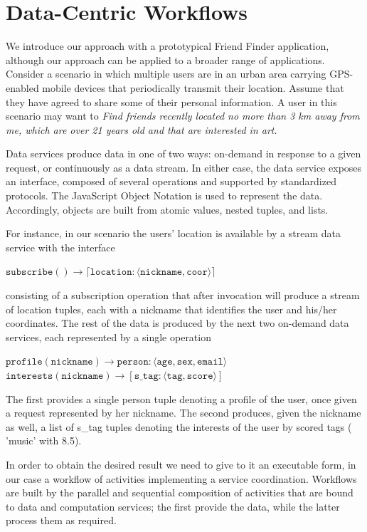 
\section{Data-Centric Workflows}\label{sec:dataCentricWorkflows}

We introduce our approach with a prototypical Friend Finder application, although our approach can be applied to a broader range of applications. Consider a scenario in which multiple users are in an urban area carrying GPS-enabled mobile devices that periodically transmit their location. Assume that they have agreed to share some of their personal information. A user in this scenario may want to \textit{Find friends recently located no more than 3 km away from me, which are over 21 years old and that are interested in art}.

Data services produce data in one of two ways: on-demand in response to a given request, or continuously as a data stream. In either case, the data service exposes an interface, composed of several operations and supported by standardized protocols. The JavaScript Object Notation is used to represent the data. Accordingly, objects are built from atomic values, nested tuples, and lists.

For instance, in our scenario the users' location is available by a stream data service with the interface
	
$\mathtt{subscribe() \rightarrow \lceil location:\langle nickname, coor\rangle\rceil}$
	
\noindent consisting of a subscription operation that after invocation will produce a stream of location tuples, each with a nickname that identifies the user and his/her coordinates. The rest of the data is produced by the next two on-demand data services, each represented by a single operation
	
$\mathtt{profile(nickname) \rightarrow person:\langle age, sex, email\rangle}$
\\
\hspace*{0.50cm}$\mathtt{interests(nickname) \rightarrow \left[s\_tag:\langle tag, score\rangle\right]}$

The first provides a single person tuple denoting a profile of the user, once given a request represented by her nickname. The second produces, given the nickname as well, a list of s\_tag tuples denoting the interests of the user by scored tags (\eg{} 'music' with 8.5).
	
In order to obtain the desired result we need to give to it an executable form, in our case a workflow of activities implementing a service coordination. Workflows are built by the parallel and sequential composition of activities that are bound to data and computation services; the first provide the data, while the latter process them as required.

